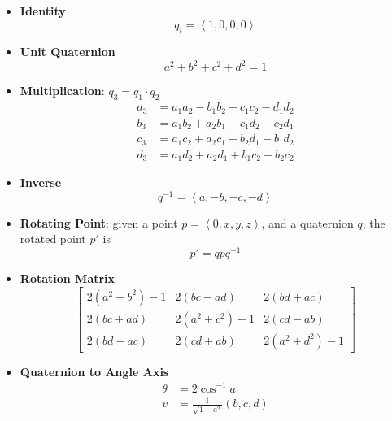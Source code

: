   \begin{itemize}
    \item \textbf{Identity}
    \begin{equation}
      q_{i} = \left< 1, 0, 0, 0 \right>
    \end{equation}

    \item \textbf{Unit Quaternion}
    \begin{equation}
      a^{2} + b^{2} + c^{2} + d^{2} = 1
    \end{equation}

    \item \textbf{Multiplication}: $ q_{3} = q_{1} \cdot q_{2} $
    \begin{equation}
      \begin{split}
        a_{3} &= a_{1} a_{2} - b_{1} b_{2} - c_{1} c_{2} - d_{1} d_{2} \\
        b_{3} &= a_{1} b_{2} + a_{2} b_{1} + c_{1} d_{2} - c_{2} d_{1} \\
        c_{3} &= a_{1} c_{2} + a_{2} c_{1} + b_{2} d_{1} - b_{1} d_{2} \\
        d_{3} &= a_{1} d_{2} + a_{2} d_{1} + b_{1} c_{2} - b_{2} c_{2}
      \end{split}
    \end{equation}

    \item \textbf{Inverse}
    \begin{equation}
      q^{-1} = \left< a, -b, -c, -d \right>
    \end{equation}

    \item \textbf{Rotating Point}: given a point $ p = \left< 0, x, y, z \right> $,
    and a quaternion $ q $, the rotated point $ p' $ is
    \begin{equation}
      p' = q p q^{-1}
    \end{equation}

    \item \textbf{Rotation Matrix}
    \begin{equation}
      \begin{bmatrix}
        2\left( a^{2} + b^{2} \right) - 1 & 2\left( bc - ad \right) & 2\left( bd + ac \right) \\
        2\left( bc + ad \right) & 2\left( a^{2} + c^{2} \right) - 1 & 2\left( cd - ab \right) \\
        2\left( bd - ac \right) & 2\left( cd + ab \right) & 2\left( a^{2} + d^{2} \right) - 1
      \end{bmatrix}
    \end{equation}

    \item \textbf{Quaternion to Angle Axis}
    \begin{align}
      \theta &= 2 \cos^{-1} a \\
      v &= \frac{1}{\sqrt{1 - a^{2}}} \left( b, c, d \right)
    \end{align}

  \end{itemize}

